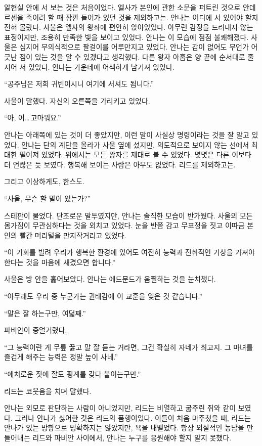 알현실 안에 서 보는 것은 처음이었다. 엘사가 본인에 관한 소문을 퍼트린 것으로 안데르센을 죽이려 할 때 잠깐 들어가 있던 것을 제외하고는. 안나는 어디에 서 있어야 할지 전혀 몰랐다. 사울은 엘사의 왕좌에 편안히 앉아있었다. 아무런 감정을 드러내지 않는 표정이지만, 조용히 만족한 빛을 보이고 있었다. 안나는 이 모습에 점점 불쾌해졌다. 사울은 심지어 무의식적으로 팔걸이를 어루만지고 있었다. 안나는 감이 없어도 무언가 어긋난 점이 있는 것을 알 수 있겠다고 생각했다. 다른 왕자 아홉은 양 끝에 순서대로 줄지어 서 있었다. 안나는 가운데에 어색하게 남겨져 있었다.

``공주님은 저희 귀빈이시니 여기에 서셔도 됩니다.''

사울이 말했다. 자신의 오른쪽을 가리키고 있었다.

``아, 어\ldots\,고마워요.''

안나는 아래쪽에 있는 것이 더 좋았지만, 이런 말이 사실상 명령이라는 것을 잘 알고 있었다. 안나는 단의 계단을 올라가 사울 옆에 섰지만, 의도적으로 보이지 않는 선에서 최대한 떨어져 있었다. 위에서는 모든 왕자를 제대로 볼 수 있었다. 몇몇은 다른 이보다 더 언짢은 듯 보였다. 행복해 보이는 사람은 아무도 없었다. 리드를 제외하고는.

그리고 이상하게도, 한스도.

``사울, 무슨 할 말이 있는가?''

스테판이 물었다. 단조로운 말투였지만, 안나는 솔직한 모습이 반가웠다. 사울의 모든 몸가짐이 무관심하다는 것을 외치고 있었다. 눈을 반쯤 감고 무표정을 짓고 이따금 본인의 빨간 머리털을 만지작거리고 있었다.

``이 기회를 빌려 우리가 행복한 환경에 있어도 여전히 능력과 진취적인 기상을 가져야  한다는 것을 마음에 새겼으면 합니다.''

사울은 방 안을 훑어보았다. 안나는  에드문드가 움찔하는 것을 눈치챘다.

``아무래도 우리 중 누군가는 권태감에 이 교훈을 잊은 것 같습니다.''

``말은 잘 하는구만, 여덟째.''

파비안이 중얼거렸다.

``그 능력이란 게 무릎 꿇고 말 잘 듣는 거라면, 그건 확실히 자네가 최고지. 그 마녀를 즐겁게 해주는 능력은 정말 높이 사네.''

``애처로운 짓에 잘도 핑계를 갖다 붙이는구만.''

리드는 코웃음을 치며 말했다.

안나는 외모로 판단하는 사람이 아니었지만, 리드는 비열하고 굶주린 쥐와 같이 보였다. 그러나 안나가 싫어한 것은 리드의 품행이었다. 이들이 처음 마주쳤을 때, 리드는 안나가 있는 방향으로 명확하지는 않았지만, 욕을 내뱉었다. 항상 외설적인 농담을 만들어내는 리드와 파비안 사이에서, 안나는 누구를 응원해야 할지 알지 못했다.

